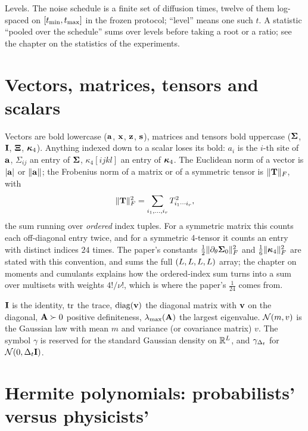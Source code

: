 Levels. The noise schedule is a finite set of diffusion times, twelve of them
log-spaced on $[t_{\min},t_{\max}]$ in the frozen protocol; ``level'' means one such $t$.
A statistic ``pooled over the schedule'' sums over levels before taking a root or a
ratio; see the chapter on the statistics of the experiments.

\section{Vectors, matrices, tensors and scalars}

Vectors are bold lowercase ($\mathbf{a}$, $\mathbf{x}$, $\mathbf{z}$, $\mathbf{s}$), matrices and tensors bold
uppercase ($\mathbf{\Sigma}$, $\mathbf{I}$, $\mathbf{\Xi}$, $\bm{\kappa}_4$). Anything indexed down to a scalar loses its
bold: $a_i$ is the $i$-th site of $\mathbf{a}$, $\Sigma_{ij}$ an entry of $\mathbf{\Sigma}$,
$\kappa_4[ijkl]$ an entry of $\bm{\kappa}_4$. The Euclidean norm of a vector is $|\mathbf{a}|$ or
$\lVert\mathbf{a}\rVert$; the Frobenius norm of a matrix or of a symmetric tensor is
$\lVert \mathbf{T} \rVert_{F}$, with
\begin{equation}
  \lVert \mathbf{T} \rVert_{F}^2=\sum_{i_1,\dots,i_r}T_{i_1\cdots i_r}^2,
  \label{eq:frob}
\end{equation}
the sum running over \emph{ordered} index tuples. For a symmetric matrix this counts
each off-diagonal entry twice, and for a symmetric 4-tensor it counts an entry with
distinct indices $24$ times. The paper's constants $\tfrac12\lVert \partial_\theta\mathbf{\Sigma}_0 \rVert_{F}^2$
and $\tfrac16\lVert \bm{\kappa}_4 \rVert_{F}^2$ are stated with this convention, and
 sums the full $(L,L,L,L)$
array; the chapter on moments and cumulants explains how the ordered-index sum turns
into a sum over multisets with weights $4!/\nu!$, which is where the paper's $\tfrac1{24}$
comes from.

$\mathbf{I}$ is the identity, $\operatorname{tr}$ the trace, $\operatorname{diag}(\mathbf{v})$ the diagonal matrix with
$\mathbf{v}$ on the diagonal, $\mathbf{A}\succ0$ positive definiteness, $\lambda_{\max}(\mathbf{A})$ the
largest eigenvalue. $\mathcal{N}\!\left(m,v\right)$ is the Gaussian law with mean $m$ and variance (or
covariance matrix) $v$. The symbol $\gamma$ is reserved for the standard Gaussian
density on $\mathbb{R}^{L}$, and $\gamma_{\Delta_t}$ for $\mathcal{N}\!\left(0,\Delta_t\mathbf{I}\right)$.

\section{Hermite polynomials: probabilists' versus physicists'}

